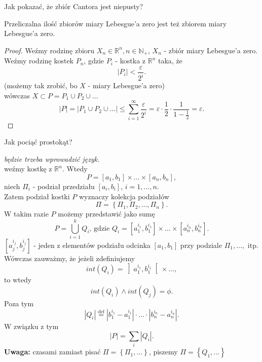 \documentclass[../main.tex]{subfiles}
\begin{document}
\begin{pytanie}
    Jak pokazać, że zbiór Cantora jest niepusty?
\end{pytanie}
\begin{stw}
    Przeliczalna ilość zbiorów miary Lebesgue'a zero jest też zbiorem miary Lebesgue'a zero.
\end{stw}
\begin{proof}
    Weźmy rodzinę zbioru $X_n \in \mathbb{R}^n, n\in \mathbb{N}_+$, $X_n$ - zbiór miary Lebesgue'a zero.\\
    Weźmy rodzinę kostek $P_n$, gdzie $P_i$ - kostka z $\mathbb{R}^n$ taka, że
    \[
    \left| P_i \right| < \frac{\varepsilon}{2^i}
    .\]
(możemy tak zrobić, bo $X$ - miary Lebesgue'a zero)\\
wówczas $X\subset P = P_1 \cup P_2 \cup \ldots$
\[
\left| P \right| = \left| P_1 \cup P_2 \cup \ldots  \right| \le \sum_{i = 1}^{\infty} \frac{\varepsilon}{2^i} = \varepsilon\cdot \frac{1}{2}\cdot \frac{1}{1-\frac{1}{2}} = \varepsilon
.\]
\end{proof}
\begin{pytanie}
    Jak pociąć prostokąt?
\end{pytanie}
\textit{będzie trzeba wprowadzić język.}\\
weźmy kostkę z $\mathbb{R}^n$. Wtedy
\[
    P = \left[ a_1, b_1 \right] \times \ldots \times \left[ a_n, b_n \right]
,\]
niech $\Pi_i$ - podział przedziału $\left[ a_i, b_i \right]$, $i = 1, \ldots, n$.\\
Zatem podział kostki $P$ wyznaczy kolekcja podziałów
\[
    \Pi = \left\{ \Pi_1, \Pi_2, \ldots, \Pi_n \right\}
.\]
W takim razie $P$ możemy przedstawić jako sumę
\[
    P = \bigcup_{i = 1}^k Q_i \text{, gdzie } Q_i = \left[ a_1^{i_1}, b_1^{i_1} \right] \times \ldots \times \left[ a_n^{i_n}, b_n^{i_n} \right]
.\]
$\left[ a_j^{i_j}, b_j^{i_j} \right] $ - jeden z elementów podziału odcinka $[a_1, b_1]$ przy podziale $\Pi_1, \ldots, $ itp.\\
Wówczas zauważmy, że jeżeli zdefiniujemy
\[
    int(Q_i) = \left] a_1^{i_1}, b_1^{i_1}\right[ \times \ldots
,\]
to wtedy
\[
    int(Q_i) \land int(Q_j) = \phi
.\]
Poza tym
\[
\left| Q_i \right| \overset{\text{def}}{=} \left| b_1^{i_1} - a_1^{i_1} \right| \cdot \ldots \cdot \left| b_n^{i_n} - a_n^{i_n} \right|
.\]
W związku z tym
\[
\left| P \right| = \sum_i \left| Q_i \right|
.\]
\textbf{Uwaga:} czasami zamiast pisać $\Pi = \left\{ \Pi_1, \ldots \right\} $, piszemy $\Pi = \left\{ Q_1, \ldots \right\} $
\end{document}
